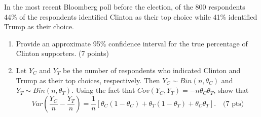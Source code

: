 

\item In the most recent Bloomberg poll before the election, of the 800 
respondents 44\% of the respondents identified Clinton as their top choice 
while 41\% identified Trump as their choice. 

\begin{enumerate}
\item Provide an approximate 95\% confidence interval for the true percentage of 
Clinton supporters. (7 points)

\vfill
% 
% 

\item Let $Y_C$ and $Y_T$ be the number of respondents who indicated Clinton 
and Trump as their top choices, respectively. Then $Y_C \sim Bin(n,\theta_C)$ 
and $Y_T \sim Bin(n,\theta_T)$. Using the fact that 
$Cov(Y_C,Y_T) = -n\theta_C \theta_T$, show that 
\[
Var\left( \frac{Y_C}{n} - \frac{Y_T}{n}\right) = 
\frac{1}{n}\left[ \theta_C(1 - \theta_C) + \theta_T(1-\theta_T) + \theta_C\theta_T \right]. \quad \mbox{(7 pts)}
\]

\ansfont{
\[ \begin{array}{rl}
Var\left( \frac{Y_C}{n} - \frac{Y_T}{n}\right) 
&= \frac{1}{n^2}Var(Y_C-Y_T) \\
&= \frac{1}{n^2}\left[ Var(Y_C)+Var(Y_T)-Cov(Y_C,Y_T) \right] \\
&= \frac{1}{n^2}\left[ n\theta_C(1-\theta_C)+n\theta_T(1-\theta_T)+n\theta_C \theta_T \right] \\
&= \frac{1}{n}\left[ \theta_C(1 - \theta_C) + \theta_T(1-\theta_T) + \theta_C\theta_T \right]
\end{array} \]
}


\end{enumerate}
